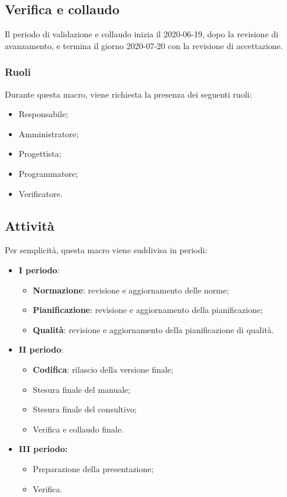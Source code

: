 \documentclass[../piano-di-progetto.tex]{subfiles}
\begin{document}
\subsection{Verifica e collaudo}
Il periodo di validazione e collaudo inizia il 2020-06-19, dopo la revisione di avanzamento, e termina il giorno 2020-07-20 con la revisione di accettazione. 

\subsubsection{Ruoli}
Durante questa macro, viene richiesta la presenza dei seguenti ruoli:
\begin{itemize}
    \item Responsabile;
    \item Amministratore;
    \item Progettista;
    \item Programmatore;
    \item Verificatore.
\end{itemize}

\subsection{Attività}
Per semplicità, questa macro viene suddivisa in periodi:

\begin{itemize}
    \item \textbf{I periodo}:
        \begin{itemize}
            \item \textbf{Normazione}: revisione e aggiornamento delle norme;
            \item \textbf{Pianificazione}: revisione e aggiornamento della pianificazione;
            \item \textbf{Qualità}: revisione e aggiornamento della pianificazione di qualità.
        \end{itemize}
    \item \textbf{II periodo}:
        \begin{itemize}
            \item \textbf{Codifica}: rilascio della versione finale;
            \item Stesura finale del manuale;
            \item Stesura finale del consultivo;
            \item Verifica e collaudo finale.
        \end{itemize}
    \item \textbf{III periodo:}
        \begin{itemize}
            \item Preparazione della presentazione;
            \item Verifica.
        \end{itemize}
\end{itemize}
\end{document}
